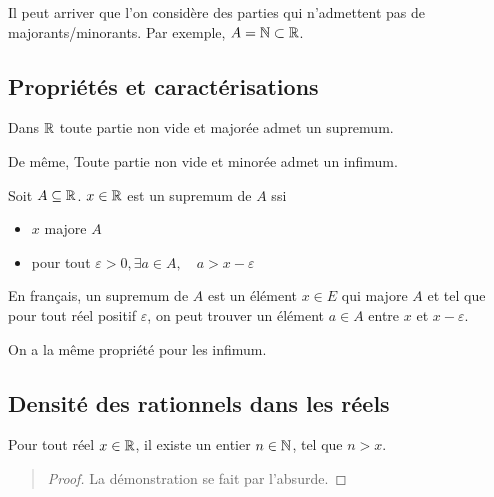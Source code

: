 \begin{example}
    Il peut arriver que l'on considère des parties qui n'admettent pas de majorants/minorants. 
    Par exemple, $A = \mathbb{N} \subset \mathbb{R}$. 
\end{example}

\subsection{Propriétés et caractérisations}

\begin{theorem}[Existence]
    Dans $\mathbb{R}$ toute partie non vide et majorée admet un supremum. 

    De même, {Toute partie non vide et minorée admet un infimum.}
\end{theorem}

\begin{proposition}
    Soit $A \subseteq \mathbb{R}$. $x \in \mathbb{R}$ est un supremum de $A$ ssi 
    \begin{itemize}
        \item $x$ majore $A$
        \item pour tout $\varepsilon > 0, \exists a \in A, \quad a > x - \varepsilon $
    \end{itemize}
    En français, un supremum de $A$ est un élément $x \in E$ qui majore $A$ et tel que pour tout réel 
    positif $\varepsilon$, on peut trouver un élément $a \in A$ entre $x$ et $x - \varepsilon$. 

    On a la même propriété pour les infimum. 
\end{proposition}

\subsection{Densité des rationnels dans les réels}

\begin{prop}[Archimède]
    Pour tout réel $x \in \mathbb{R}$, il existe un entier $n \in \mathbb{N}$, tel que $n > x$. 
\end{prop}

\begin{quote}
    \begin{footnotesize}
        \begin{proof}
            La démonstration se fait par l'absurde. 
        \end{proof}
    \end{footnotesize}
\end{quote}

